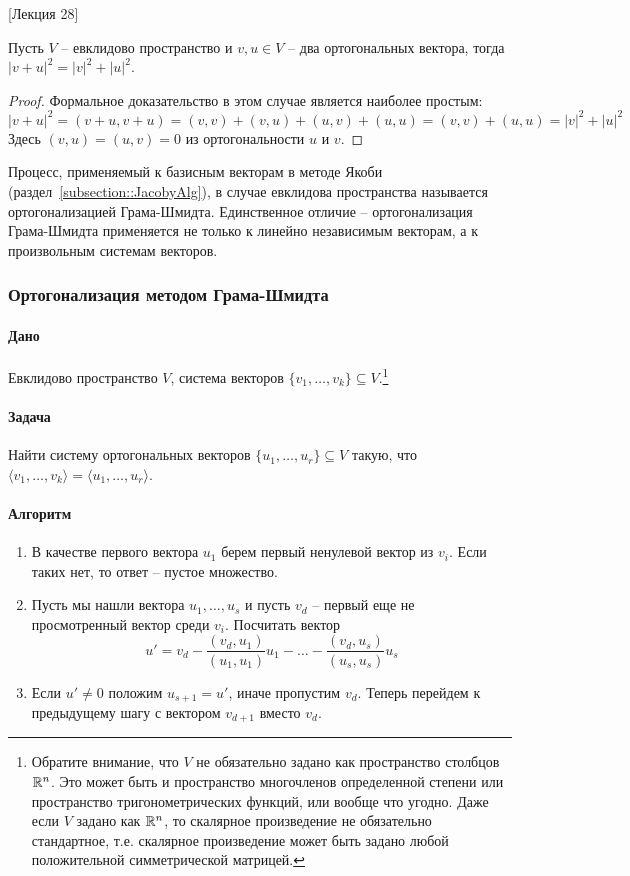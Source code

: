 [Лекция 28]

\begin{claim}\label{claim::Pythagoras}
Пусть $V$ -- евклидово пространство и $v,u\in V$ -- два ортогональных вектора, тогда $|v + u|^2 = |v|^2 + |u|^2$.
\end{claim}
\begin{proof}
Формальное доказательство в этом случае является наиболее простым:
\[
|v+u|^2 = (v+u, v+u) = (v,v) + (v,u)+(u,v) +(u,u) = (v,v) + (u,u) = |v|^2 + |u|^2
\]
Здесь $(v,u)=(u,v) = 0$ из ортогональности $u$ и $v$.
\end{proof}

Процесс, применяемый к базисным векторам в методе Якоби (раздел~\ref{subsection::JacobyAlg}), в случае евклидова пространства называется ортогонализацией Грама-Шмидта. Единственное отличие -- ортогонализация Грама-Шмидта применяется не только к линейно независимым векторам, а к произвольным системам векторов.

\subsubsection*{Ортогонализация методом Грама-Шмидта}

\paragraph{Дано} Евклидово пространство $V$, система векторов $\{v_1,\ldots,v_k\}\subseteq V$.\footnote{Обратите внимание, что $V$ не обязательно задано как пространство столбцов $\mathbb R^{n}$. Это может быть и пространство многочленов определенной степени или пространство тригонометрических функций, или вообще что угодно. Даже если $V$ задано как $\mathbb R^{n}$, то скалярное произведение не обязательно стандартное, т.е. скалярное произведение может быть задано любой положительной симметрической матрицей.}

\paragraph{Задача} Найти систему ортогональных векторов $\{u_1,\ldots,u_r\}\subseteq V$ такую, что $\langle v_1,\ldots,v_k\rangle = \langle u_1,\ldots,u_r\rangle$.

\paragraph{Алгоритм}
\begin{enumerate}
\item В качестве первого вектора $u_1$ берем первый ненулевой вектор из $v_i$. Если таких нет, то ответ -- пустое множество.

\item Пусть мы нашли вектора $u_1,\ldots,u_s$ и пусть $v_d$ -- первый еще не просмотренный вектор среди $v_i$. Посчитать вектор 
\[
u' = v_d - \frac{(v_d, u_1)}{(u_1,u_1)} u_1 - \ldots - \frac{(v_d, u_s)}{(u_s, u_s)}u_s
\]
\item Если $u' \neq 0$ положим $u_{s+1} = u'$, иначе пропустим $v_d$. Теперь перейдем к предыдущему шагу с вектором $v_{d+1}$ вместо $v_d$.
\end{enumerate}


